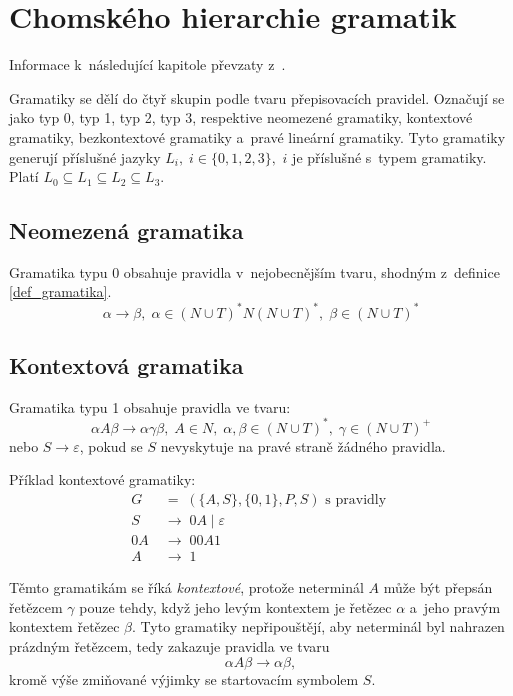 \section{Chomského hierarchie gramatik}\label{kap_chomsky_hierarchie}
Informace k~následující kapitole převzaty z~\cite{TIN-opora}.

Gramatiky se dělí do čtyř skupin podle tvaru přepisovacích pravidel.
Označují se jako typ 0, typ 1, typ 2, typ 3, respektive neomezené gramatiky, kontextové gramatiky, bezkontextové gramatiky a~pravé lineární gramatiky.
Tyto gramatiky generují příslušné jazyky $L_i,\; i \in \{0, 1, 2, 3\},$ $i$ je příslušné s~typem gramatiky.
Platí $L_0 \subseteq L_1 \subseteq L_2 \subseteq L_3$.

\subsection*{Neomezená gramatika}
Gramatika typu 0 obsahuje pravidla v~nejobecnějším tvaru, shodným z~definice \ref{def_gramatika}.
\begin{equation*}
    \alpha \rightarrow \beta,\; \alpha \in (N \cup T)^*N(N \cup T)^*,\; \beta \in (N \cup T)^*
\end{equation*}

\subsection*{Kontextová gramatika}
Gramatika typu 1 obsahuje pravidla ve tvaru:
\begin{equation*}
    \alpha A \beta \rightarrow \alpha \gamma \beta,\; A \in N,\; \alpha, \beta \in (N \cup T)^*,\; \gamma \in (N \cup T)^+
\end{equation*}
nebo $S \rightarrow \varepsilon$, pokud se $S$ nevyskytuje na pravé straně žádného pravidla.
\begin{example}
    Příklad kontextové gramatiky:
    \begin{align*}
        G \; &= \; (\{A, S\}, \{0, 1\}, P, S) \text{ s~pravidly }\\
        S \; &\rightarrow \; 0A \; | \; \varepsilon \\ 
        0A \; &\rightarrow \; 00A1 \\
        A \; &\rightarrow \; 1
    \end{align*}
\end{example}

Těmto gramatikám se říká \emph{kontextové}, protože neterminál $A$ může být přepsán řetězcem $\gamma$ pouze tehdy, když jeho levým kontextem je řetězec $\alpha$ a~jeho pravým kontextem řetězec $\beta$.
Tyto gramatiky nepřipouštějí, aby neterminál byl nahrazen prázdným řetězcem, tedy zakazuje pravidla ve tvaru
\begin{equation*}
    \alpha A \beta \rightarrow \alpha \beta,
\end{equation*}
kromě výše zmiňované výjimky se startovacím symbolem $S$.

